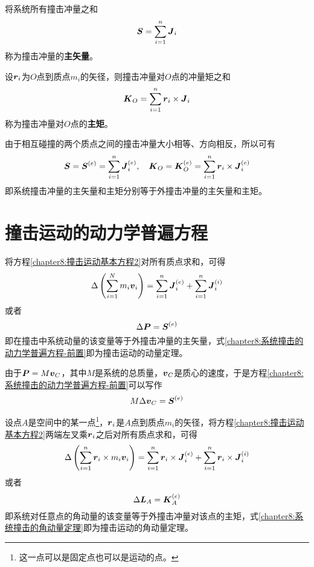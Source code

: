 将系统所有撞击冲量之和
\begin{equation}
	\boldsymbol{S} = \sum_{i=1}^n \boldsymbol{J}_i
\end{equation}
称为撞击冲量的{\bf 主矢量}。

设$\boldsymbol{r}_i$为$O$点到质点$m_i$的矢径，则撞击冲量对$O$点的冲量矩之和
\begin{equation}
	\boldsymbol{K}_O = \sum_{i=1}^n\boldsymbol{r}_i\times \boldsymbol{J}_i
\end{equation}
称为撞击冲量对$O$点的{\bf 主矩}。

由于相互碰撞的两个质点之间的撞击冲量大小相等、方向相反，所以可有
\begin{equation}
	\boldsymbol{S} = \boldsymbol{S}^{(e)} = \sum_{i=1}^n\boldsymbol{J}_i^{(e)},\quad \boldsymbol{K}_O = \boldsymbol{K}_O^{(e)} = \sum_{i=1}^n\boldsymbol{r}_i\times \boldsymbol{J}_i^{(e)}
\end{equation}
即系统撞击冲量的主矢量和主矩分别等于外撞击冲量的主矢量和主矩。

\section{撞击运动的动力学普遍方程}

将方程\eqref{chapter8:撞击运动基本方程2}对所有质点求和，可得
\begin{equation*}
	\Delta \left(\sum_{i=1}^Nm_i\boldsymbol{v}_i\right) = \sum_{i=1}^n\boldsymbol{J}_i^{(e)}+\sum_{i=1}^n\boldsymbol{J}_i^{(i)}
\end{equation*}
或者
\begin{equation}
	\Delta \boldsymbol{P} = \boldsymbol{S}^{(e)}
	\label{chapter8:系统撞击的动力学普遍方程-前置}
\end{equation}
即在撞击中系统动量的该变量等于外撞击冲量的主矢量，式\eqref{chapter8:系统撞击的动力学普遍方程-前置}即为撞击运动的动量定理。

由于$\boldsymbol{P}=M\boldsymbol{v}_C$，其中$M$是系统的总质量，$\boldsymbol{v}_C$是质心的速度，于是方程\eqref{chapter8:系统撞击的动力学普遍方程-前置}可以写作
\begin{equation}
	M\Delta \boldsymbol{v}_C = \boldsymbol{S}^{(e)}
	\label{chapter8:系统撞击的动量定理}
\end{equation}

设点$A$是空间中的某一点\footnote{这一点可以是固定点也可以是运动的点。}，$\boldsymbol{r}_i$是$A$点到质点$m_i$的矢径，将方程\eqref{chapter8:撞击运动基本方程2}两端左叉乘$\boldsymbol{r}_i$之后对所有质点求和，可得
\begin{equation*}
	\Delta \left(\sum_{i=1}^n\boldsymbol{r}_i\times m_i\boldsymbol{v}_i\right) = \sum_{i=1}^n\boldsymbol{r}_i\times \boldsymbol{J}_i^{(e)}+\sum_{i=1}^n\boldsymbol{r}_i\times \boldsymbol{J}_i^{(i)}
\end{equation*}
或者
\begin{equation}
	\Delta\boldsymbol{L}_A = \boldsymbol{K}_A^{(e)}
	\label{chapter8:系统撞击的角动量定理}
\end{equation}
即系统对任意点的角动量的该变量等于外撞击冲量对该点的主矩，式\eqref{chapter8:系统撞击的角动量定理}即为撞击运动的角动量定理。

